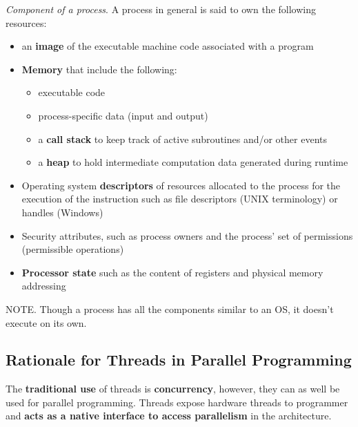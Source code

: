 \documentclass[12pt, a4paper]{report}
\begin{document}
{\textit{Component of a process}}. A process in general is said to own the following resources:
\begin{itemize}
    \item an {\bfseries image} of the executable machine code associated with a program
    \item {\bfseries{Memory}} that include the following:
            \begin{itemize}
                \item executable code
                \item process-specific data (input and output)
                \item a {\bfseries{call stack}} to keep track of active subroutines and/or other events
                \item a {\bfseries{heap}} to hold intermediate computation data generated during runtime
            \end{itemize}
    \item Operating system {\bfseries{descriptors}} of resources allocated to the process for the execution of the instruction
          such as file descriptors (UNIX terminology) or handles (Windows)
    \item Security attributes, such as process owners and the process' set of permissions (permissible operations)
    \item {\bfseries{Processor state}} such as the content of registers and physical memory addressing
\end{itemize}

{\large{NOTE.}} Though a process has all the components similar to an OS, it doesn't execute on its own.

\subsection{Rationale for Threads in Parallel Programming}
The {\bfseries{traditional use}} of threads is {\bfseries{concurrency}}, however, they can as well be used for parallel 
programming. Threads expose hardware threads to programmer and {\bfseries{acts as a native interface to access parallelism}} in 
the architecture.
\end{document}
